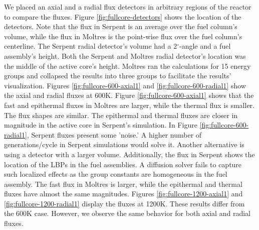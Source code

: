\documentclass[11pt,letterpaper]{article}
\begin{document}
We placed an axial and a radial flux detectors in arbitrary regions of the reactor to compare the fluxes.
Figure \ref{fig:fullcore-detectors} shows the location of the detectors.
Note that the flux in Serpent is an average over the fuel column's volume, while the flux in Moltres is the point-wise flux over the fuel column's centerline.
The Serpent radial detector's volume had a 2$^{\circ}$-angle and a fuel assembly's height.
Both the Serpent and Moltres radial detector's location was the middle of the active core's height.
Moltres ran the calculations for 15 energy groups and collapsed the results into three groups to facilitate the results' visualization.
Figures \ref{fig:fullcore-600-axial1} and \ref{fig:fullcore-600-radial1} show the axial and radial fluxes at 600K.
Figure \ref{fig:fullcore-600-axial1} shows that the fast and epithermal fluxes in Moltres are larger, while the thermal flux is smaller.
The flux shapes are similar.
The epithermal and thermal fluxes are closer in magnitude in the active core in Serpent's simulation.
In Figure \ref{fig:fullcore-600-radial1}, Serpent fluxes present some 'noise.'
A higher number of generations/cycle in Serpent simulations would solve it.
Another alternative is using a detector with a larger volume.
Additionally, the flux in Serpent shows the location of the LBPs in the fuel assemblies.
A diffusion solver fails to capture such localized effects as the group constants are homogeneous in the fuel assembly.
The fast flux in Moltres is larger, while the epithermal and thermal fluxes have almost the same magnitudes.
Figures \ref{fig:fullcore-1200-axial1} and \ref{fig:fullcore-1200-radial1} display the fluxes at 1200K.
These results differ from the 600K case.
However, we observe the same behavior for both axial and radial fluxes.
\end{document}
